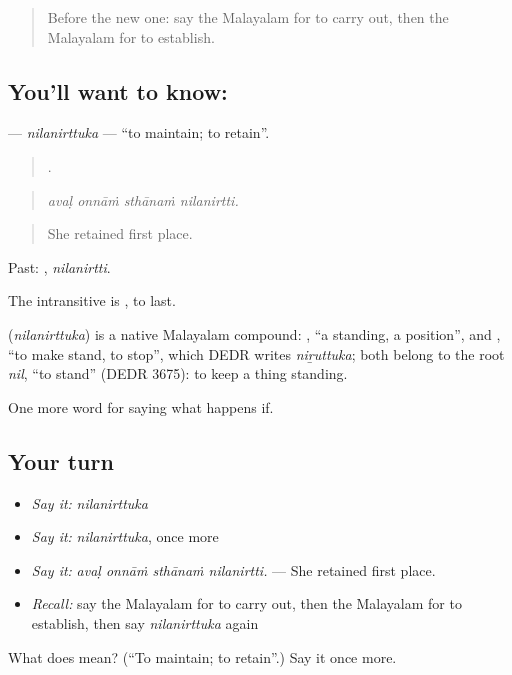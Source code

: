 \begin{quote}
Before the new one: say the Malayalam for to carry out, then the Malayalam for to establish.
\end{quote}

\subsection*{You'll want to know: }
\textbf{} — \emph{nilanirttuka} — \textquotedblleft{}to maintain; to retain\textquotedblright{}.

\begin{quote}
   .
\end{quote}

\begin{quote}
\emph{avaḷ onnāṁ sthānaṁ nilanirtti.}
\end{quote}

\begin{quote}
She retained first place.
\end{quote}

Past: , \emph{nilanirtti}.

The intransitive is , to last.

\begin{cousinweb}
\textbf{} (\emph{nilanirttuka}) is a native Malayalam compound: , \textquotedblleft{}a standing, a position\textquotedblright{}, and , \textquotedblleft{}to make stand, to stop\textquotedblright{}, which DEDR writes \emph{niṟuttuka}; both belong to the root \emph{nil}, \textquotedblleft{}to stand\textquotedblright{} (DEDR 3675): to keep a thing standing.
\end{cousinweb}

\begin{grammarlens}[title={What you've built}]
One more word for saying what happens if.
\end{grammarlens}

\subsection*{Your turn}
\begin{itemize}
\raggedright
  \item \emph{Say it:} \emph{nilanirttuka}
  \item \emph{Say it:} \emph{nilanirttuka}, once more
  \item \emph{Say it:} \emph{avaḷ onnāṁ sthānaṁ nilanirtti.} — She retained first place.
  \item \emph{Recall:} say the Malayalam for to carry out, then the Malayalam for to establish, then say \emph{nilanirttuka} again
\end{itemize}

\begin{tcolorbox}[breakable,colback=teal!4,colframe=teal!35!black,title={Before you move on}]
What does  mean? (\textquotedblleft{}To maintain; to retain\textquotedblright{}.) Say it once more.
\end{tcolorbox}
